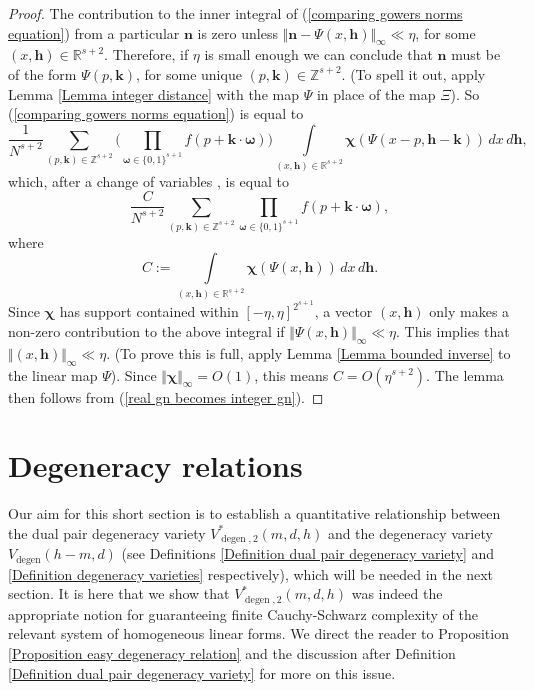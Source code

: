\documentclass[12pt,a4paper,twoside,reqno]{amsart}
\newcommand{\bo}{\boldsymbol{\omega}}
\newcommand{\bc}{\boldsymbol{\chi}}
\newcommand{\degen}{\operatorname{degen}}
\numberwithin{equation}{section}
\begin{document}
\begin{proof}
The contribution to the inner integral of (\ref{comparing gowers norms equation}) from a particular $\mathbf{n}$ is zero unless $\Vert \mathbf{n} - \Psi(x,\mathbf{h})\Vert_\infty \ll \eta$, for some $(x,\mathbf{h}) \in \mathbb{R}^{s+2}$. Therefore, if $\eta$ is small enough we can conclude that $\mathbf{n}$ must be of the form $\Psi(p,\mathbf{k})$, for some unique $(p,\mathbf{k}) \in \mathbb{Z}^{s+2}$. (To spell it out, apply Lemma \ref{Lemma integer distance} with the map $\Psi$ in place of the map $\Xi$). So (\ref{comparing gowers norms equation}) is equal to 
\begin{equation}
\frac{1}{N^{s+2}} \sum\limits_{(p,\mathbf{k}) \in \mathbb{Z}^{s+2}} \Big(\prod\limits_{\bo \in \{0,1\}^{s+1}} f(p + \mathbf{k} \cdot \bo) \Big) \int\limits_{(x,\mathbf{h})\in \mathbb{R}^{s+2}} \boldsymbol{\chi}(\Psi(x -p,\mathbf{h} - \mathbf{k})) \, dx \, d\mathbf{h}, 
\end{equation}
\noindent which, after a change of variables , is equal to 
\begin{equation}
\label{real gn becomes integer gn}
\frac{C}{N^{s+2}}\sum\limits_{(p,\mathbf{k})\in \mathbb{Z}^{s+2}}\prod\limits_{\boldsymbol{\omega}\in \{0,1\}^{s+1}} f(p+ \mathbf{k}\cdot\boldsymbol{\omega}),
\end{equation}
\noindent where \[C:=\int\limits_{(x,\mathbf{h})\in \mathbb{R}^{s+2}} \boldsymbol{\chi} (\Psi(x,\mathbf{h})) \, dx \, d\mathbf{h}.\] Since $\boldsymbol{\chi}$ has support contained within $[-\eta,\eta]^{2^{s+1}}$, a vector $(x,\mathbf{h})$ only makes a non-zero contribution to the above integral if $\Vert \Psi(x,\mathbf{h})\Vert_\infty \ll \eta$. This implies that $\Vert (x,\mathbf{h})\Vert_\infty \ll \eta$. (To prove this is full, apply Lemma \ref{Lemma bounded inverse} to the linear map $\Psi$). Since $\Vert \bc\Vert_\infty = O(1)$, this means $C = O(\eta^{s+2})$. The lemma then follows from (\ref{real gn becomes integer gn}). 
\end{proof}




\section{Degeneracy relations}
\label{section Degeneracy relations}
Our aim for this short section is to establish a quantitative relationship between the dual pair degeneracy variety $V_{\degen,2}^*(m,d,h)$ and the degeneracy variety $V_{\degen}(h-m,d)$ (see Definitions \ref{Definition dual pair degeneracy variety} and \ref{Definition degeneracy varieties} respectively), which will be needed in the next section. It is here that we show that $V_{\degen,2}^*(m,d,h)$ was indeed the appropriate notion for guaranteeing finite Cauchy-Schwarz complexity of the relevant system of homogeneous linear forms. We direct the reader to Proposition \ref{Proposition easy degeneracy relation} and the discussion after Definition \ref{Definition dual pair degeneracy variety} for more on this issue. 
\end{document}
